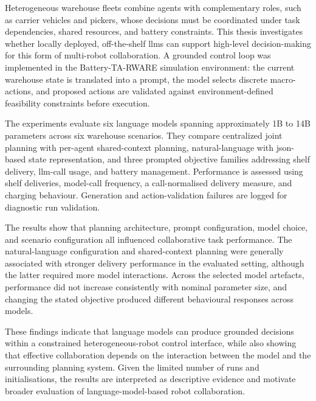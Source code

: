 Heterogeneous warehouse fleets combine agents with complementary roles, such as carrier vehicles and pickers, whose decisions must be coordinated under task dependencies, shared resources, and battery constraints. This thesis investigates whether locally deployed, off-the-shelf \glspl{llm} can support high-level decision-making for this form of multi-robot collaboration. A grounded control loop was implemented in the Battery-TA-RWARE simulation environment: the current warehouse state is translated into a prompt, the model selects discrete macro-actions, and proposed actions are validated against environment-defined feasibility constraints before execution.

The experiments evaluate six language models spanning approximately 1B to 14B parameters across six warehouse scenarios. They compare centralized joint planning with per-agent shared-context planning, natural-language with \gls{json}-based state representation, and three prompted objective families addressing shelf delivery, \gls{llm}-call usage, and battery management. Performance is assessed using shelf deliveries, model-call frequency, a call-normalised delivery measure, and charging behaviour. Generation and action-validation failures are logged for diagnostic run validation.

The results show that planning architecture, prompt configuration, model choice, and scenario configuration all influenced collaborative task performance. The natural-language configuration and shared-context planning were generally associated with stronger delivery performance in the evaluated setting, although the latter required more model interactions. Across the selected model artefacts, performance did not increase consistently with nominal parameter size, and changing the stated objective produced different behavioural responses across models.

These findings indicate that language models can produce grounded decisions within a constrained heterogeneous-robot control interface, while also showing that effective collaboration depends on the interaction between the model and the surrounding planning system. Given the limited number of runs and initialisations, the results are interpreted as descriptive evidence and motivate broader evaluation of language-model-based robot collaboration.
